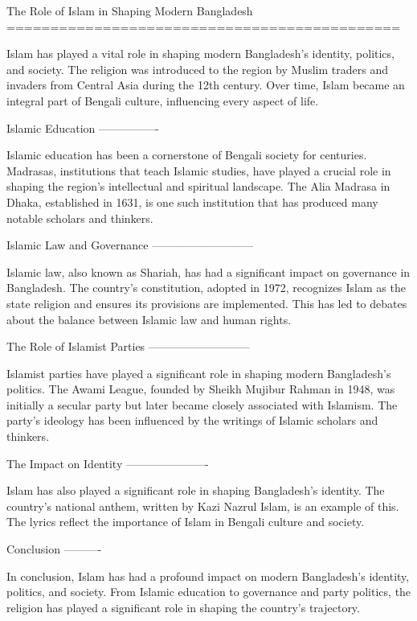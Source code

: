 The Role of Islam in Shaping Modern Bangladesh
=============================================

Islam has played a vital role in shaping modern Bangladesh's identity, politics, and society. The religion was introduced to the region by Muslim traders and invaders from Central Asia during the 12th century. Over time, Islam became an integral part of Bengali culture, influencing every aspect of life.

Islamic Education
----------------

Islamic education has been a cornerstone of Bengali society for centuries. Madrasas, institutions that teach Islamic studies, have played a crucial role in shaping the region's intellectual and spiritual landscape. The Alia Madrasa in Dhaka, established in 1631, is one such institution that has produced many notable scholars and thinkers.

Islamic Law and Governance
---------------------------

Islamic law, also known as Shariah, has had a significant impact on governance in Bangladesh. The country's constitution, adopted in 1972, recognizes Islam as the state religion and ensures its provisions are implemented. This has led to debates about the balance between Islamic law and human rights.

The Role of Islamist Parties
---------------------------

Islamist parties have played a significant role in shaping modern Bangladesh's politics. The Awami League, founded by Sheikh Mujibur Rahman in 1948, was initially a secular party but later became closely associated with Islamism. The party's ideology has been influenced by the writings of Islamic scholars and thinkers.

The Impact on Identity
----------------------

Islam has also played a significant role in shaping Bangladesh's identity. The country's national anthem, written by Kazi Nazrul Islam, is an example of this. The lyrics reflect the importance of Islam in Bengali culture and society.

Conclusion
----------

In conclusion, Islam has had a profound impact on modern Bangladesh's identity, politics, and society. From Islamic education to governance and party politics, the religion has played a significant role in shaping the country's trajectory.